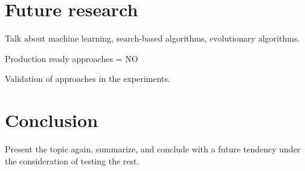 \documentclass[english]{tktltiki}
\begin{document}
\section{Future research}
Talk about machine learning, search-based algorithms, evolutionary algorithms.

Production ready approaches = NO

Validation of approaches in the experiments. 

\section{Conclusion}
Present the topic again, summarize, and conclude with a future tendency under the consideration of testing the rest.

\newpage
\nocite{*}
%
%


%



\lastpage
\end{document}
